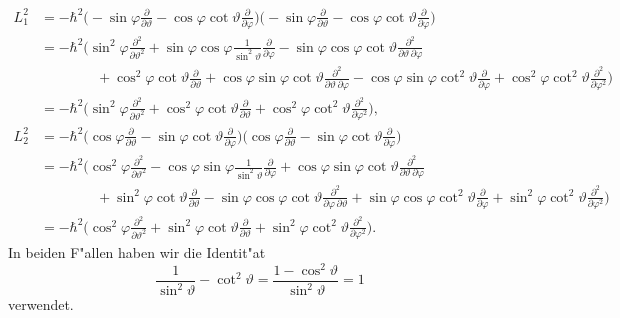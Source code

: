 \begin{align*}
L_1^2
&=-\hbar^2
\biggl(
-\sin\varphi\frac{\partial}{\partial\vartheta}
-\cos\varphi\cot\vartheta\frac{\partial}{\partial\varphi}
\biggr)
\biggl(
-\sin\varphi\frac{\partial}{\partial\vartheta}
-\cos\varphi\cot\vartheta\frac{\partial}{\partial\varphi}
\biggr)
\\
&=
-\hbar^2\biggl(
\sin^2\varphi\frac{\partial^2}{\partial \vartheta^2}
+
\sin\varphi\cos\varphi \frac{1}{\sin^2\vartheta}
\frac{\partial}{\partial\varphi}
-
\sin\varphi\cos\varphi\cot\vartheta\frac{\partial^2}{\partial\vartheta\,\partial\varphi}
\\
&\qquad\qquad
+\cos^2\varphi\cot\vartheta\frac{\partial}{\partial\vartheta}
+\cos\varphi\sin\varphi\cot\vartheta\frac{\partial^2}{\partial\vartheta\,\partial\varphi}
-\cos\varphi\sin\varphi\cot^2\vartheta\frac{\partial}{\partial\varphi}
+\cos^2\varphi\cot^2\vartheta\frac{\partial^2}{\partial\varphi^2}
\biggr)
\\
&=
-\hbar^2\biggl(
\sin^2\varphi\frac{\partial^2}{\partial\vartheta^2}
+
\cos^2\varphi\cot\vartheta\frac{\partial}{\partial\vartheta}
+
\cos^2\varphi\cot^2\vartheta\frac{\partial^2}{\partial\varphi^2}
\biggr),
\\
L_2^2
&=
-\hbar^2
\biggl(
\cos\varphi\frac{\partial}{\partial\vartheta}
-\sin\varphi\cot\vartheta\frac{\partial}{\partial\varphi}
\biggr)
\biggl(
\cos\varphi\frac{\partial}{\partial\vartheta}
-\sin\varphi\cot\vartheta\frac{\partial}{\partial\varphi}
\biggr)
\\
&=-\hbar^2
\biggl(
\cos^2\varphi\frac{\partial^2}{\partial\vartheta^2}
-\cos\varphi\sin\varphi\frac{1}{\sin^2\vartheta}\frac{\partial}{\partial\varphi}
+\cos\varphi\sin\varphi\cot\vartheta\frac{\partial^2}{\partial\vartheta\,\partial\varphi}
\\
&\qquad\qquad
+\sin^2\varphi\cot\vartheta\frac{\partial}{\partial\vartheta}
-\sin\varphi\cos\varphi\cot\vartheta\frac{\partial^2}{\partial\varphi\,\partial\vartheta}
+\sin\varphi\cos\varphi\cot^2\vartheta\frac{\partial}{\partial\varphi}
+\sin^2\varphi\cot^2\vartheta\frac{\partial^2}{\partial\varphi^2}
\biggr)
\\
&=
-\hbar^2\biggl(
\cos^2\varphi\frac{\partial^2}{\partial\vartheta^2}
+
\sin^2\varphi\cot\vartheta\frac{\partial}{\partial\vartheta}
+
\sin^2\varphi\cot^2\vartheta\frac{\partial^2}{\partial\varphi^2}
\biggr).
\end{align*}
In beiden F"allen haben wir die Identit"at
\[
\frac1{\sin^2\vartheta}
-
\cot^2\vartheta
=\frac{1-\cos^2\vartheta}{\sin^2\vartheta}=1
\]
verwendet.
